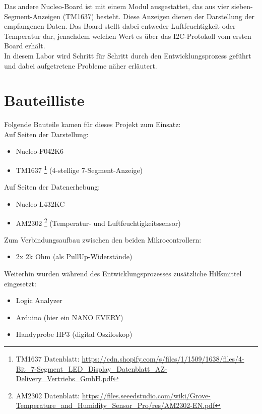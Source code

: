 \documentclass[11pt,a4paper,titlepage]{article}
\begin{document}
Das andere Nucleo-Board ist mit einem Modul ausgestattet, das aus vier sieben-Segment-Anzeigen (TM1637) besteht.
Diese Anzeigen dienen der Darstellung der empfangenen Daten.
Das Board stellt dabei entweder Luftfeuchtigkeit oder Temperatur dar,
jenachdem welchen Wert es über das I2C-Protokoll vom ersten Board erhält.\\

In diesem Labor wird Schritt für Schritt durch den Entwicklungsprozess geführt und dabei aufgetretene Probleme näher erläutert.

\section{Bauteilliste}
Folgende Bauteile kamen für dieses Projekt zum Einsatz:\\

Auf Seiten der Darstellung:
\begin{itemize}
    \item Nucleo-F042K6
    \item TM1637
          \footnote{TM1637 Datenblatt: \url{https://cdn.shopify.com/s/files/1/1509/1638/files/4-Bit_7-Segment_LED_Display_Datenblatt_AZ-Delivery_Vertriebs_GmbH.pdf}}
          (4-stellige 7-Segment-Anzeige)
\end{itemize}

Auf Seiten der Datenerhebung:
\begin{itemize}
    \item Nucleo-L432KC
    \item AM2302
          \footnote{AM2302 Datenblatt: \url{https://files.seeedstudio.com/wiki/Grove-Temperature_and_Humidity_Sensor_Pro/res/AM2302-EN.pdf}}
          (Temperatur- und Luftfeuchtigkeitssensor)
\end{itemize}

Zum Verbindungsaufbau zwischen den beiden Mikrocontrollern:
\begin{itemize}
    \item 2x 2k Ohm (als PullUp-Widerstände)
\end{itemize}

Weiterhin wurden während des Entwicklungsprozesses zusätzliche Hilfsmittel eingesetzt:
\begin{itemize}
    \item Logic Analyzer
    \item Arduino (hier ein NANO EVERY)
    \item Handyprobe HP3 (digital Osziloskop)
\end{itemize}
\end{document}
